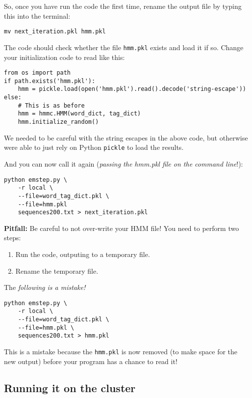 So, once you have run the code the first time, rename the output file by typing this into the terminal:

\begin{verbatim}
mv next_iteration.pkl hmm.pkl
\end{verbatim}

The code should check whether the file \verb+hmm.pkl+ exists and load it if so.
Change your initialization code to read like this:

\begin{verbatim}
from os import path
if path.exists('hmm.pkl'):
    hmm = pickle.load(open('hmm.pkl').read().decode('string-escape'))
else:
    # This is as before
    hmm = hmmc.HMM(word_dict, tag_dict)
    hmm.initialize_random()
\end{verbatim}

We needed to be careful with the string escapes in the above code, but
otherwise were able to just rely on Python \verb+pickle+ to load the results.

And you can now call it again (\emph{passing the hmm.pkl file on the command
line}!):

\begin{verbatim}
python emstep.py \
    -r local \
    --file=word_tag_dict.pkl \
    --file=hmm.pkl
    sequences200.txt > next_iteration.pkl
\end{verbatim}

\textbf{Pitfall:} Be careful to not over-write your HMM file! You need to
perform two steps:

\begin{enumerate}
\item Run the code, outputing to a temporary file.
\item Rename the temporary file.
\end{enumerate}

The \emph{following is a mistake!}
\begin{verbatim}
python emstep.py \
    -r local \
    --file=word_tag_dict.pkl \
    --file=hmm.pkl \
    sequences200.txt > hmm.pkl
\end{verbatim}

This is a mistake because the \verb+hmm.pkl+ is now removed (to make space for
the new output) before your program has a chance to read it!

\subsection{Running it on the cluster}

